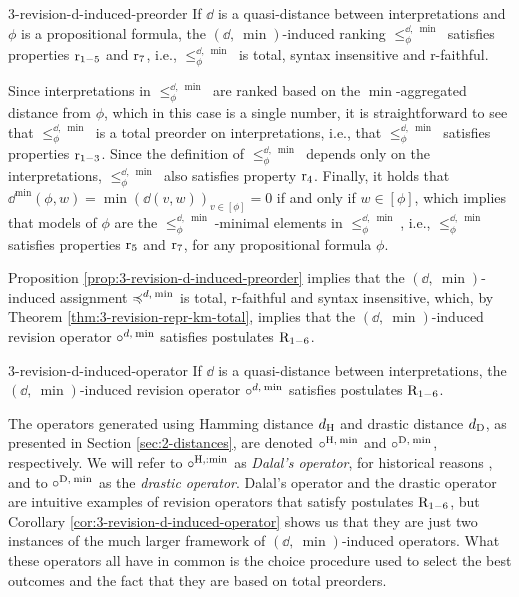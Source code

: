 \begin{prp}{}{3-revision-d-induced-preorder}
	If $\dd$ is a quasi-distance between interpretations and $\phi$ is a propositional formula, 
	the ${(\dd,\:\min)}$-induced ranking $\le^{\dd,\:\min}_\phi$ 
	satisfies properties $\mathrm{r}_{1-5}$ and $\mathrm{r}_{7}$,
	i.e., $\le^{\dd,\:\min}_\phi$ is total, syntax insensitive and r-faithful.
\end{prp}
\begin{prf*}{}{}%
	Since interpretations in $\le_{\phi}^{\dd,\:\min}$ are ranked based on the $\min$-aggregated distance
	from $\phi$, which in this case is a single number,
	it is straightforward to see that $\le_{\phi}^{\dd,\:\min}$ is a total preorder on interpretations,
	i.e., that $\le_{\phi}^{\dd,\:\min}$ satisfies properties $\mathrm{r}_{1-3}$.
	Since the definition of $\le_{\phi}^{\dd,\:\min}$ depends only on the interpretations,
	$\le_{\phi}^{\dd,\:\min}$ also satisfies property $\mathrm{r}_{4}$.
	Finally, it holds that 
	$\dd^\min(\phi,w) = \min(\dd(v,w))_{v\in[\phi]} = 0$ if and only if
	$w\in[\phi]$, 
	which implies that models of $\phi$ are the $\le_{\phi}^{\dd,\:\min}$-minimal
	elements in $\le_{\phi}^{\dd,\:\min}$,
	i.e., $\le_{\phi}^{\dd,\:\min}$ satisfies properties $\mathrm{r}_{5}$ and $\mathrm{r}_{7}$, for any propositional formula $\phi$.		
\end{prf*}

Proposition \ref{prop:3-revision-d-induced-preorder} 
implies that the $({\dd,\:\min})$-induced assignment $\preccurlyeq^{d,\:{\operatorname{min}}}$ 
is total, r-faithful and syntax insensitive, 
which, by Theorem \ref{thm:3-revision-repr-km-total}, 
implies that the $({\dd,\:\min})$-induced revision operator 
$\circ^{d,\:{\operatorname{min}}}$ satisfies postulates $\mathrm{R}_{1-6}$.

\begin{crl}{}{3-revision-d-induced-operator}
	If $\dd$ is a quasi-distance between interpretations, 
	the $(\dd,\:\min)$-induced revision operator $\circ^{d,\:{\operatorname{min}}}$ 
	satisfies postulates $\mathrm{R}_{1-6}$.
\end{crl}

The operators generated using Hamming distance $d_{{\operatorname{H}}}$
and drastic distance $d_{{\operatorname{D}}}$,
as presented in Section \ref{sec:2-distances},
are denoted $\circ^{{\operatorname{H}},\:{\operatorname{min}}}$ and $\circ^{{\operatorname{D}},\:{\operatorname{min}}}$,
respectively.
We will refer to $\circ^{{\operatorname{H}},:{\operatorname{min}}}$ as \emph{Dalal's operator},
for historical reasons \cite{Dalal88}, 
and to $\circ^{{\operatorname{D}},\:{\operatorname{min}}}$ as the \emph{drastic operator}.
Dalal's operator and the drastic operator are intuitive examples
of revision operators that satisfy postulates $\mathrm{R}_{1-6}$,
but Corollary \ref{cor:3-revision-d-induced-operator} shows us 
that they are just two instances of the much larger framework
of $(\dd,\:\min)$-induced operators.
What these operators all have in common is the choice procedure 
used to select the best outcomes and 
the fact that they are based on total preorders.

